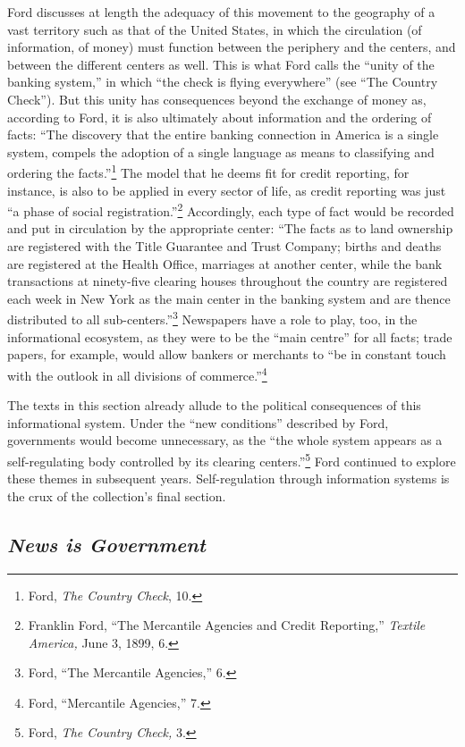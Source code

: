 \documentclass[openany,nobib]{tufte-book}
\begin{document}
Ford discusses at length the adequacy of this movement to the geography
of a vast territory such as that of the United States, in which the
circulation (of information, of money) must function between the
periphery and the centers, and between the different centers as well.
This is what Ford calls the ``unity of the banking system,'' in which
``the check is flying everywhere'' (see ``The Country Check''). But this
unity has consequences beyond the exchange of money as, according to
Ford, it is also ultimately about information and the ordering of facts:
``The discovery that the entire banking connection in America is a
single system, compels the adoption of a single language as means to
classifying and ordering the facts.''\footnote{Ford, \emph{The Country
  Check}, 10.} The model that he deems fit for credit reporting, for
instance, is also to be applied in every sector of life, as credit
reporting was just ``a phase of social registration.''\footnote{Franklin
  Ford, ``The Mercantile Agencies and Credit Reporting,'' \emph{Textile
  America,} June 3, 1899, 6.} Accordingly, each type of fact would be
recorded and put in circulation by the appropriate center: ``The facts
as to land ownership are registered with the Title Guarantee and Trust
Company; births and deaths are registered at the Health Office,
marriages at another center, while the bank transactions at ninety-five
clearing houses throughout the country are registered each week in New
York as the main center in the banking system and are thence distributed
to all sub-centers.''\footnote{Ford, ``The Mercantile Agencies,'' 6.}
Newspapers have a role to play, too, in the informational ecosystem, as
they were to be the ``main centre'' for all facts; trade papers, for
example, would allow bankers or merchants to ``be in constant touch with
the outlook in all divisions of commerce.''\footnote{Ford, ``Mercantile
  Agencies,'' 7.}

The texts in this section already allude to the political consequences
of this informational system. Under the ``new conditions'' described by
Ford, governments would become unnecessary, as the ``the whole system
appears as a self-regulating body controlled by its clearing
centers.''\footnote{Ford, \emph{The Country Check,} 3.} Ford continued
to explore these themes in subsequent years. Self-regulation through
information systems is the crux of the collection's final section.

\hypertarget{news-is-government}{%
\subsection{\texorpdfstring{\emph{News is
Government}}{News is Government}}\label{news-is-government}}
\end{document}
